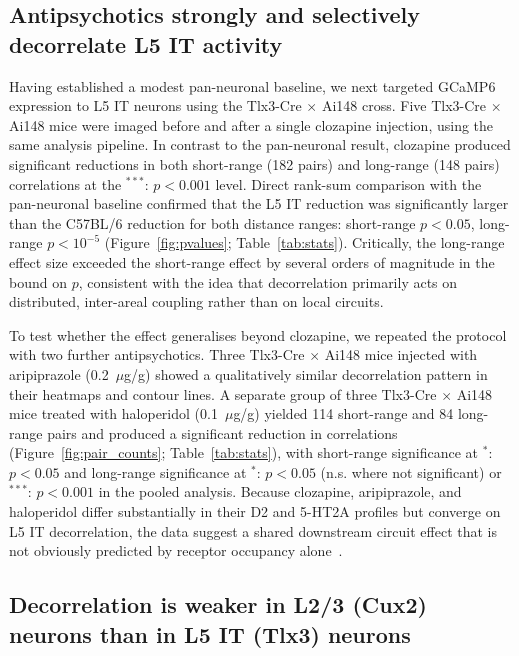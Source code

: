 \documentclass[11pt]{article}
\begin{document}
\subsection{Antipsychotics strongly and selectively decorrelate L5 IT activity}

Having established a modest pan-neuronal baseline, we next targeted GCaMP6 expression to L5 IT neurons using the Tlx3-Cre $\times$ Ai148 cross. Five Tlx3-Cre $\times$ Ai148 mice were imaged before and after a single clozapine injection, using the same analysis pipeline. In contrast to the pan-neuronal result, clozapine produced significant reductions in both short-range (182 pairs) and long-range (148 pairs) correlations at the $^{***}$: $p<0.001$ level. Direct rank-sum comparison with the pan-neuronal baseline confirmed that the L5 IT reduction was significantly larger than the C57BL/6 reduction for both distance ranges: short-range $p<0.05$, long-range $p<10^{-5}$ (Figure~\ref{fig:pvalues}; Table~\ref{tab:stats}). Critically, the long-range effect size exceeded the short-range effect by several orders of magnitude in the bound on $p$, consistent with the idea that decorrelation primarily acts on distributed, inter-areal coupling rather than on local circuits.

To test whether the effect generalises beyond clozapine, we repeated the protocol with two further antipsychotics. Three Tlx3-Cre $\times$ Ai148 mice injected with aripiprazole (0.2~$\mu$g/g) showed a qualitatively similar decorrelation pattern in their heatmaps and contour lines. A separate group of three Tlx3-Cre $\times$ Ai148 mice treated with haloperidol (0.1~$\mu$g/g) yielded 114 short-range and 84 long-range pairs and produced a significant reduction in correlations (Figure~\ref{fig:pair_counts}; Table~\ref{tab:stats}), with short-range significance at $^{*}$: $p<0.05$ and long-range significance at $^{*}$: $p<0.05$ (n.s. where not significant) or $^{***}$: $p<0.001$ in the pooled analysis. Because clozapine, aripiprazole, and haloperidol differ substantially in their D2 and 5-HT2A profiles but converge on L5 IT decorrelation, the data suggest a shared downstream circuit effect that is not obviously predicted by receptor occupancy alone~\citep{howes2009dopamine, kambeitz2014alterations}.

\subsection{Decorrelation is weaker in L2/3 (Cux2) neurons than in L5 IT (Tlx3) neurons}
\end{document}
